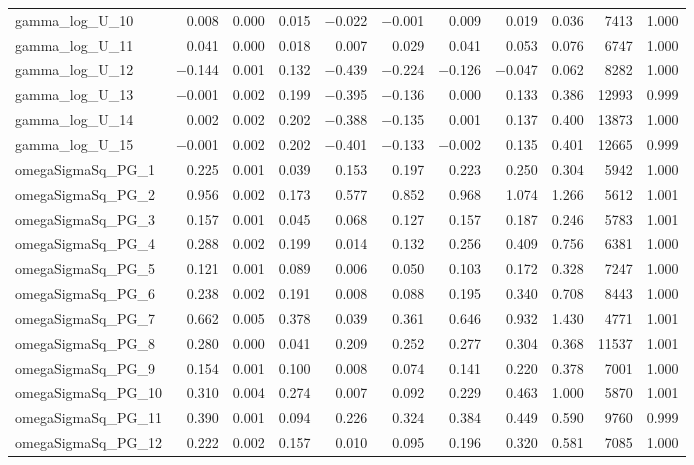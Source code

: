 \documentclass[12pt]{article}
\begin{document}
\begin{longtable}{lrrrrrrrrrr}
gamma\_log\_U\_10 &  0.008 & 0.000 & 0.015 & $-$0.022 & $-$0.001 &  0.009 &  0.019 &  0.036 & 7413 & 1.000 \\
gamma\_log\_U\_11 &  0.041 & 0.000 & 0.018 &  0.007 &  0.029 &  0.041 &  0.053 &  0.076 & 6747 & 1.000 \\
gamma\_log\_U\_12 & $-$0.144 & 0.001 & 0.132 & $-$0.439 & $-$0.224 & $-$0.126 & $-$0.047 &  0.062 & 8282 & 1.000 \\
gamma\_log\_U\_13 & $-$0.001 & 0.002 & 0.199 & $-$0.395 & $-$0.136 &  0.000 &  0.133 &  0.386 & 12993 & 0.999 \\
gamma\_log\_U\_14 &  0.002 & 0.002 & 0.202 & $-$0.388 & $-$0.135 &  0.001 &  0.137 &  0.400 & 13873 & 1.000 \\
gamma\_log\_U\_15 & $-$0.001 & 0.002 & 0.202 & $-$0.401 & $-$0.133 & $-$0.002 &  0.135 &  0.401 & 12665 & 0.999 \\
\addlinespace
omegaSigmaSq\_PG\_1  & 0.225 & 0.001 & 0.039 & 0.153 & 0.197 & 0.223 & 0.250 & 0.304 & 5942 & 1.000 \\
omegaSigmaSq\_PG\_2  & 0.956 & 0.002 & 0.173 & 0.577 & 0.852 & 0.968 & 1.074 & 1.266 & 5612 & 1.001 \\
omegaSigmaSq\_PG\_3  & 0.157 & 0.001 & 0.045 & 0.068 & 0.127 & 0.157 & 0.187 & 0.246 & 5783 & 1.001 \\
omegaSigmaSq\_PG\_4  & 0.288 & 0.002 & 0.199 & 0.014 & 0.132 & 0.256 & 0.409 & 0.756 & 6381 & 1.000 \\
omegaSigmaSq\_PG\_5  & 0.121 & 0.001 & 0.089 & 0.006 & 0.050 & 0.103 & 0.172 & 0.328 & 7247 & 1.000 \\
omegaSigmaSq\_PG\_6  & 0.238 & 0.002 & 0.191 & 0.008 & 0.088 & 0.195 & 0.340 & 0.708 & 8443 & 1.000 \\
omegaSigmaSq\_PG\_7  & 0.662 & 0.005 & 0.378 & 0.039 & 0.361 & 0.646 & 0.932 & 1.430 & 4771 & 1.001 \\
omegaSigmaSq\_PG\_8  & 0.280 & 0.000 & 0.041 & 0.209 & 0.252 & 0.277 & 0.304 & 0.368 & 11537 & 1.001 \\
omegaSigmaSq\_PG\_9  & 0.154 & 0.001 & 0.100 & 0.008 & 0.074 & 0.141 & 0.220 & 0.378 & 7001 & 1.000 \\
omegaSigmaSq\_PG\_10 & 0.310 & 0.004 & 0.274 & 0.007 & 0.092 & 0.229 & 0.463 & 1.000 & 5870 & 1.001 \\
omegaSigmaSq\_PG\_11 & 0.390 & 0.001 & 0.094 & 0.226 & 0.324 & 0.384 & 0.449 & 0.590 & 9760 & 0.999 \\
omegaSigmaSq\_PG\_12 & 0.222 & 0.002 & 0.157 & 0.010 & 0.095 & 0.196 & 0.320 & 0.581 & 7085 & 1.000 \\

\end{longtable}
\end{document}
